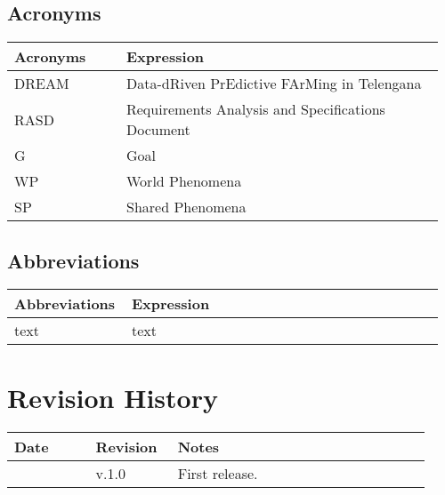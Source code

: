 \subsection{Acronyms}

\begin{center}
	\begin{tabular}{@{}p{0.25\linewidth} p{0.71\linewidth}@{}}
		\toprule
		\textbf{Acronyms}   & \textbf{Expression}\\
		\midrule
		DREAM               & Data-dRiven PrEdictive FArMing in Telengana\\
		RASD                & Requirements Analysis and Specifications Document\\
		G                   & Goal\\
		WP                  & World Phenomena\\
		SP                  & Shared Phenomena\\
		\bottomrule
	\end{tabular}
\end{center}

\subsection{Abbreviations}
\begin{center}
	\begin{tabular}{@{}p{0.25\linewidth} p{0.71\linewidth}@{}}
		\toprule
		\textbf{Abbreviations}  & \textbf{Expression}\\
		\midrule
	    text & text\\
		\bottomrule
	\end{tabular}
\end{center}

\section{Revision History}

\begin{center}
	\begin{tabular}{@{}p{0.18\linewidth} p{0.18\linewidth} p{0.57\linewidth}@{}}
		\toprule
		\textbf{Date}   & \textbf{Revision} & \textbf{Notes}\\
		\midrule
		\date{}         & v.1.0             & First release.\\
		\bottomrule
	\end{tabular}
\end{center}

